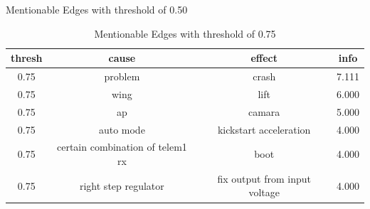 \begin{table}
\begin{center}
        \caption{Mentionable Edges with threshold of 0.50}\label{tab:information-score-50}
        \begin{tabular}[t]{||c c c c||}
            \hline
            thresh & cause                            & effect                        & info \\ [0.5ex]
            \hline\hline
            0.75   & problem                          & crash                         & 7.111 \\ \hline
            0.75   & wing                             & lift                          & 6.000 \\ \hline
            0.75   & ap                               & camara                        & 5.000 \\ \hline
            0.75   & auto mode                        & kickstart acceleration        & 4.000 \\ \hline
            0.75   & certain combination of telem1 rx & boot                          & 4.000 \\ \hline
            0.75   & right step regulator             & fix output from input voltage & 4.000 \\ \hline
        \end{tabular}
        \caption{Mentionable Edges with threshold of 0.75}\label{tab:information-score-75}
    \end{center}
\end{table}

